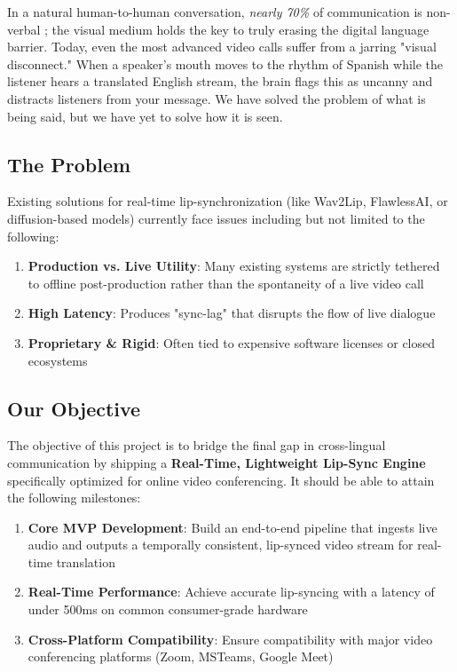 In a natural human-to-human conversation, \textit{nearly 70\%} of communication is non-verbal \cite{mehrabian1971silent}; the visual medium holds the key to truly erasing the digital language barrier. Today, even the most advanced video calls suffer from a jarring "visual disconnect." When a speaker's mouth moves to the rhythm of Spanish while the listener hears a translated English stream, the brain flags this as uncanny and distracts listeners from your message. We have solved the problem of what is being said, but we have yet to solve how it is seen.

\subsection{The Problem}

Existing solutions for real-time lip-synchronization (like Wav2Lip, FlawlessAI, or diffusion-based models) currently face issues including but not limited to the following:

\begin{enumerate}
    \item \textbf{Production vs. Live Utility}: Many existing systems are strictly tethered to offline post-production rather than the spontaneity of a live video call
    \item \textbf{High Latency}: Produces "sync-lag" that disrupts the flow of live dialogue
    \item \textbf{Proprietary \& Rigid}: Often tied to expensive software licenses or closed ecosystems
\end{enumerate}

\subsection{Our Objective}

The objective of this project is to bridge the final gap in cross-lingual communication by shipping a \textbf{Real-Time, Lightweight Lip-Sync Engine} specifically optimized for online video conferencing. It should be able to attain the following milestones:

\begin{enumerate}
    \item \textbf{Core MVP Development}: Build an end-to-end pipeline that ingests live audio and outputs a temporally consistent, lip-synced video stream for real-time translation
    \item \textbf{Real-Time Performance}: Achieve accurate lip-syncing with a latency of under 500ms on common consumer-grade hardware
    \item \textbf{Cross-Platform Compatibility}: Ensure compatibility with major video conferencing platforms (Zoom, MSTeams, Google Meet)
\end{enumerate}

